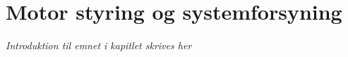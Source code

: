 \chapter{Motor styring og systemforsyning}\label{kap:chap_motor_forsyning}

\emph{Introduktion til emnet i kapitlet skrives her}